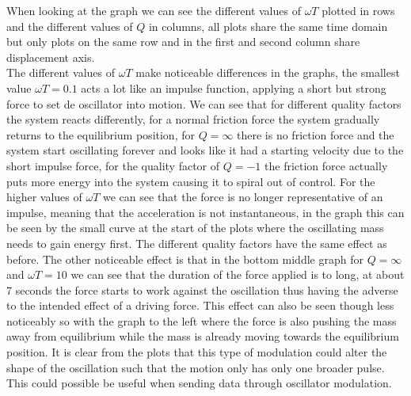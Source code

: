 When looking at the graph we can see the different values of $\omega T$ plotted in rows and the different values of $Q$ in columns, all plots share the same time domain but only plots on the same row and in the first and second column share displacement axis.\\
The different values of $\omega T$ make noticeable differences in the graphs, the smallest value $\omega T = 0.1$ acts a lot like an impulse function, applying a short but strong force to set de oscillator into motion. We can see that for different quality factors the system reacts differently, for a normal friction force the system gradually returns to the equilibrium position, for $Q = \infty$ there is no friction force and the system start oscillating forever and looks like it had a starting velocity due to the short impulse force, for the quality factor of $Q = -1$ the friction force actually puts more energy into the system causing it to spiral out of control.
For the higher values of $\omega T$ we can see that the force is no longer representative of an impulse, meaning that the acceleration is not instantaneous, in the graph this can be seen by the small curve at the start of the plots where the oscillating mass needs to gain energy first. The different quality factors have the same effect as before.
The other noticeable effect is that in the bottom middle graph for $Q=\infty$ and $\omega T = 10$ we can see that the duration of the force applied is to long, at about 7 seconds the force starts to work against the oscillation thus having the adverse to the intended effect of a driving force. This effect can also be seen though less noticeably so with the graph to the left where the force is also pushing the mass away from equilibrium while the mass is already moving towards the equilibrium position.
It is clear from the plots that this type of modulation could alter the shape of the oscillation such that the motion only has only one broader pulse. This could possible be useful when sending data through oscillator modulation.\\